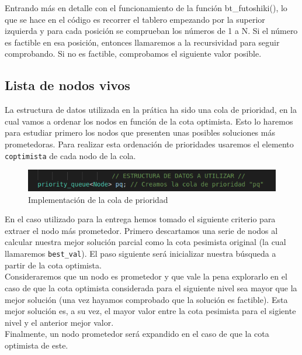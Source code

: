 \documentclass[12pt]{article}
\begin{document}
Entrando más en detalle con el funcionamiento de la función bt\_futoshiki(),
lo que se hace en el código es recorrer el tablero empezando por la superior 
izquierda y para cada posición se comprueban los números de 1 a N. Si el número es factible en esa posición,
entonces llamaremos a la recursividad para seguir comprobando. Si no es factible, comprobamos el siguiente valor posible.




\subsection{Lista de nodos vivos}
La estructura de datos utilizada en la prática ha sido una cola de prioridad,
en la cual vamos a ordenar los nodos en función de la cota optimista. Esto lo
haremos para estudiar primero los nodos que presenten unas posibles soluciones
más prometedoras. Para realizar esta ordenación de prioridades usaremos el elemento \verb|coptimista| de cada nodo
de la cola.\\

\begin{figure}[h]
    \centering
    \includegraphics[scale=0.5]{cola_de_prior.png}
    \caption{Implementación de la cola de prioridad}
    \label{fig:colprior}
\end{figure}

En el caso utilizado para la entrega hemos tomado el siguiente criterio para extraer
el nodo más prometedor. Primero descartamos una serie de nodos al calcular
nuestra mejor solución parcial como la cota pesimista original (la cual llamaremos
\verb|best_val|). El paso siguiente será inicializar nuestra búsqueda a partir de la cota optimista.\\

Consideraremos que un nodo es prometedor y que vale la pena explorarlo en el caso de que la cota optimista
considerada para el siguiente nivel sea mayor que la mejor solución (una vez hayamos comprobado que
la solución es factible). Esta mejor solución es, a su vez, el mayor valor entre la
cota pesimista para el sigiente nivel y el anterior mejor valor.\\

Finalmente, un nodo prometedor será expandido en el caso de que la cota optimista
de este.
\end{document}
